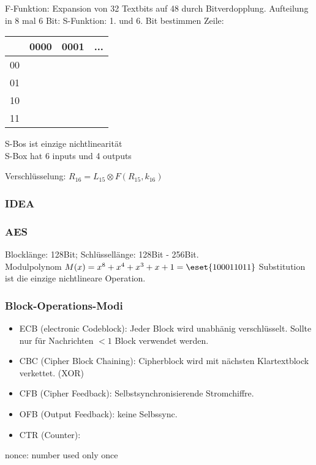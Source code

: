 \documentclass[fs]{latex4ei}
\begin{document}
\begin{multicols}{4}
			F-Funktion: Expansion von 32 Textbits auf 48 durch Bitverdopplung.
			Aufteilung in 8 mal 6 Bit: S-Funktion: 1. und 6. Bit bestimmen Zeile:
			\begin{tabular}{l|lll}
				& 0000 & 0001 & ...\\ \hline
				00 & \\
				01 & \\
				10 & \\
				11 & \\
			\end{tabular}
			S-Bos ist einzige nichtlinearität\\
			S-Box hat 6 inputs und 4 outputs
	
		Verschlüsselung: $R_{16} = L_{15} \otimes F(R_{15}, k_{16})$
	
	
		\subsubsection{IDEA}
	
	
	
		\subsubsection{AES}
		Blocklänge: 128Bit; Schlüssellänge: 128Bit - 256Bit.\\
		Modulpolynom $M(x) = x^8 + x^4 + x^3 + x + 1 = \eset{100011011}$
		Substitution ist die einzige nichtlineare Operation.\\
	
	
	
		\subsubsection{Block-Operations-Modi}
		\begin{itemize}
			\item ECB (electronic Codeblock): Jeder Block wird unabhänig verschlüsselt. Sollte nur für Nachrichten $< 1$ Block verwendet werden.
			\item CBC (Cipher Block Chaining): Cipherblock wird mit nächsten Klartextblock verkettet. (XOR)
			\item CFB (Cipher Feedback): Selbstsynchronisierende Stromchiffre.\\
			\item OFB (Output Feedback): keine Selbssync.
			\item CTR (Counter):
		\end{itemize}
		nonce: number used only once
	

\end{multicols}
\end{document}
